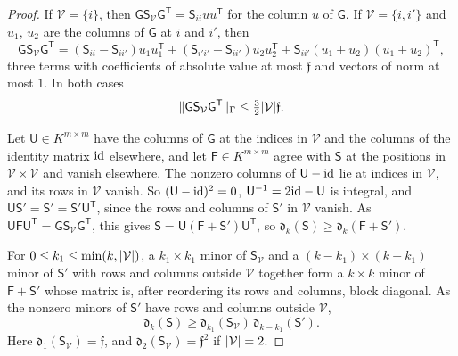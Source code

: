 \begin{proof}
If $\mathcal V=\{i\}$, then $\mathsf G\mathsf S_{\mathcal V}\mathsf G^{\mathsf T}=\mathsf S_{ii}uu^{\mathsf T}$ for the column $u$ of $\mathsf G$. If $\mathcal V=\{i,i'\}$ and $u_1$, $u_2$ are the columns of $\mathsf G$ at $i$ and $i'$, then
\[
 \mathsf G\mathsf S_{\mathcal V}\mathsf G^{\mathsf T}=(\mathsf S_{ii}-\mathsf S_{ii'})u_1u_1^{\mathsf T}
 +(\mathsf S_{i'i'}-\mathsf S_{ii'})u_2u_2^{\mathsf T}+\mathsf S_{ii'}(u_1+u_2)(u_1+u_2)^{\mathsf T},
\]
three terms with coefficients of absolute value at most $\mathfrak f$ and vectors of norm at most $1$. In both cases
\begin{equation}\label{dp:eq:pivot-cost}
 \lVert \mathsf G\mathsf S_{\mathcal V}\mathsf G^{\mathsf T}\rVert_\Gamma\le\tfrac32\lvert \mathcal V\rvert\mathfrak f.
\end{equation}

Let $\mathsf U\in K^{m\times m}$ have the columns of $\mathsf G$ at the indices in $\mathcal V$ and the columns of the identity matrix $\mathrm{id}$ elsewhere, and let $\mathsf F\in K^{m\times m}$ agree with $\mathsf S$ at the positions in $\mathcal V\times\mathcal V$ and vanish elsewhere. The nonzero columns of $\mathsf U-\mathrm{id}$ lie at indices in $\mathcal V$, and its rows in $\mathcal V$ vanish. So $(\mathsf U-\mathrm{id})^2=0$, $\mathsf U^{-1}=2\mathrm{id}-\mathsf U$ is integral, and $\mathsf U\mathsf S'=\mathsf S'=\mathsf S'\mathsf U^{\mathsf T}$, since the rows and columns of $\mathsf S'$ in $\mathcal V$ vanish. As $\mathsf U\mathsf F\mathsf U^{\mathsf T}=\mathsf G\mathsf S_{\mathcal V}\mathsf G^{\mathsf T}$, this gives $\mathsf S=\mathsf U(\mathsf F+\mathsf S')\mathsf U^{\mathsf T}$, so $\mathfrak d_k(\mathsf S)\ge\mathfrak d_k(\mathsf F+\mathsf S')$.

For $0\le k_1\le\min(k,\lvert \mathcal V\rvert)$, a $k_1\times k_1$ minor of $\mathsf S_{\mathcal V}$ and a $(k-k_1)\times(k-k_1)$ minor of $\mathsf S'$ with rows and columns outside $\mathcal V$ together form a $k\times k$ minor of $\mathsf F+\mathsf S'$ whose matrix is, after reordering its rows and columns, block diagonal. As the nonzero minors of $\mathsf S'$ have rows and columns outside $\mathcal V$,
\begin{equation}\label{dp:eq:minor-split}
 \mathfrak d_k(\mathsf S)\ge\mathfrak d_{k_1}(\mathsf S_{\mathcal V})\,\mathfrak d_{k-k_1}(\mathsf S').
\end{equation}
Here $\mathfrak d_1(\mathsf S_{\mathcal V})=\mathfrak f$, and $\mathfrak d_2(\mathsf S_{\mathcal V})=\mathfrak f^2$ if $\lvert \mathcal V\rvert=2$.


\end{proof}
